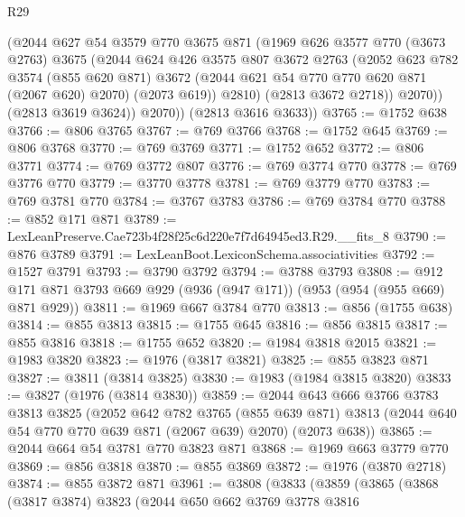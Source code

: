 \begin{lexlean}{R29}
\begin{coremodule}
              (@2044
                @627
                @54
                @3579
                @770
                @3675
                @871
                (@1969
                  @626
                  @3577
                  @770
                  (@3673 @2763)
                  @3675
                  (@2044
                    @624
                    @426
                    @3575
                    @807
                    @3672
                    @2763
                    (@2052
                      @623
                      @782
                      @3574
                      (@855 @620 @871)
                      @3672
                      (@2044 @621 @54 @770 @770 @620 @871 (@2067 @620) @2070)
                      (@2073 @619))
                    @2810)
                  (@2813 @3672 @2718))
                @2070))
            (@2813 @3619 @3624))
          @2070))
      (@2813 @3616 @3633))
@3765 := @1752 @638
@3766 := @806 @3765
@3767 := @769 @3766
@3768 := @1752 @645
@3769 := @806 @3768
@3770 := @769 @3769
@3771 := @1752 @652
@3772 := @806 @3771
@3774 := @769 @3772 @807
@3776 := @769 @3774 @770
@3778 := @769 @3776 @770
@3779 := @3770 @3778
@3781 := @769 @3779 @770
@3783 := @769 @3781 @770
@3784 := @3767 @3783
@3786 := @769 @3784 @770
@3788 := @852 @171 @871
@3789 := LexLeanPreserve.Cae723b4f28f25c6d220e7f7d64945ed3.R29.__fits_8
@3790 := @876 @3789
@3791 := LexLeanBoot.LexiconSchema.associativities
@3792 := @1527 @3791
@3793 := @3790 @3792
@3794 := @3788 @3793
@3808 := @912 @171 @871 @3793 @669 @929 (@936 (@947 @171)) (@953 (@954 (@955 @669) @871 @929))
@3811 := @1969 @667 @3784 @770
@3813 := @856 (@1755 @638)
@3814 := @855 @3813
@3815 := @1755 @645
@3816 := @856 @3815
@3817 := @855 @3816
@3818 := @1755 @652
@3820 := @1984 @3818 @2015
@3821 := @1983 @3820
@3823 := @1976 (@3817 @3821)
@3825 := @855 @3823 @871
@3827 := @3811 (@3814 @3825)
@3830 := @1983 (@1984 @3815 @3820)
@3833 := @3827 (@1976 (@3814 @3830))
@3859 := @2044
    @643
    @666
    @3766
    @3783
    @3813
    @3825
    (@2052
      @642
      @782
      @3765
      (@855 @639 @871)
      @3813
      (@2044 @640 @54 @770 @770 @639 @871 (@2067 @639) @2070)
      (@2073 @638))
@3865 := @2044 @664 @54 @3781 @770 @3823 @871
@3868 := @1969 @663 @3779 @770
@3869 := @856 @3818
@3870 := @855 @3869
@3872 := @1976 (@3870 @2718)
@3874 := @855 @3872 @871
@3961 := @3808
    (@3833
      (@3859
        (@3865
          (@3868
            (@3817 @3874)
            @3823
            (@2044
              @650
              @662
              @3769
              @3778
              @3816

\end{coremodule}
\end{lexlean}
